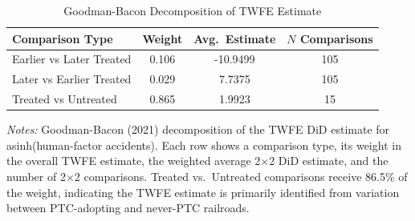 \begin{table}[!t]
\centering
\caption{Goodman-Bacon Decomposition of TWFE Estimate}
\label{tab:bacon}
\small
\begin{tabular}{lccc}
\toprule
Comparison Type & Weight & Avg.\ Estimate & $N$ Comparisons \\
\midrule
Earlier vs Later Treated & 0.106 & -10.9499 & 105 \\
Later vs Earlier Treated & 0.029 & 7.7375 & 105 \\
Treated vs Untreated & 0.865 & 1.9923 & 15 \\
\bottomrule
\end{tabular}
\par\vspace{0.3em}
\parbox{\textwidth}{\footnotesize
\textit{Notes:} Goodman-Bacon (2021) decomposition of the TWFE DiD estimate for asinh(human-factor accidents). Each row shows a comparison type, its weight in the overall TWFE estimate, the weighted average 2$\times$2 DiD estimate, and the number of 2$\times$2 comparisons. Treated vs.\ Untreated comparisons receive 86.5\% of the weight, indicating the TWFE estimate is primarily identified from variation between PTC-adopting and never-PTC railroads.
}
\end{table}
